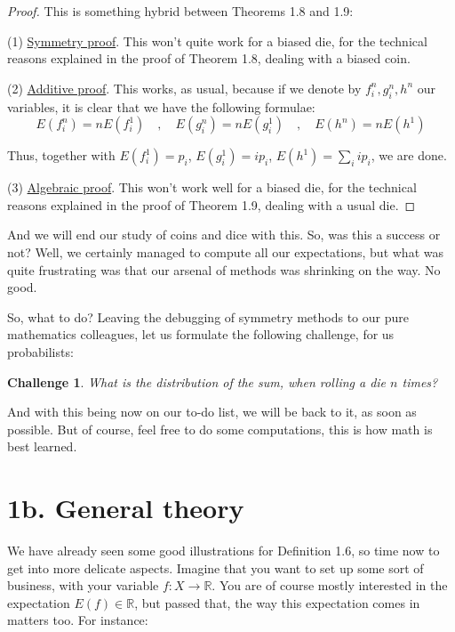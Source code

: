 \documentclass[12pt]{amsbook}
\newtheorem{challenge}[theorem]{Challenge}
\begin{document}
\begin{proof}
This is something hybrid between Theorems 1.8 and 1.9:

\medskip

(1) \underline{Symmetry proof}. This won't quite work for a biased die, for the technical reasons explained in the proof of Theorem 1.8, dealing with a biased coin.

\medskip

(2) \underline{Additive proof}. This works, as usual, because if we denote by $f_i^n,g_i^n,h^n$ our variables, it is clear that we have the following formulae:
$$E(f_i^n)=nE(f_i^1)\quad,\quad E(g_i^n)=nE(g_i^1)\quad,\quad E(h^n)=nE(h^1)$$

Thus, together with $E(f_i^1)=p_i$, $E(g_i^1)=ip_i$, $E(h^1)=\sum_iip_i$, we are done.

\medskip

(3) \underline{Algebraic proof}. This won't work well for a biased die, for the technical reasons explained in the proof of Theorem 1.9, dealing with a usual die.
\end{proof}

And we will end our study of coins and dice with this. So, was this a success or not? Well, we certainly managed to compute all our expectations, but what was quite frustrating was that our arsenal of methods was shrinking on the way. No good.

\bigskip

So, what to do? Leaving the debugging of symmetry methods to our pure mathematics colleagues, let us formulate the following challenge, for us probabilists:

\begin{challenge}
What is the distribution of the sum, when rolling a die $n$ times?
\end{challenge}

And with this being now on our to-do list, we will be back to it, as soon as possible. But of course, feel free to do some computations, this is how math is best learned.

\section*{1b. General theory}

We have already seen some good illustrations for Definition 1.6, so time now to get into more delicate aspects. Imagine that you want to set up some sort of business, with your variable $f:X\to\mathbb R$. You are of course mostly interested in the expectation $E(f)\in\mathbb R$, but passed that, the way this expectation comes in matters too. For instance:
\end{document}
